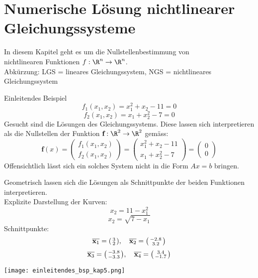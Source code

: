 \section{Numerische Lösung nichtlinearer Gleichungssysteme}

\begin{remark}
    In diesem Kapitel geht es um die Nullstellenbestimmung von\\ nichtlinearen Funktionen $f: \R^n \to \R^n$. \\
    Abkürzung: LGS = lineares Gleichungssystem, NGS = nichtlineares Gleichungssystem
\end{remark}

\begin{example2}{Einleitendes Beispiel}
    $$f_1(x_1, x_2) = x_1^2 + x_2 - 11 = 0$$
    $$f_2(x_1, x_2) = x_1 + x_2^2 - 7 = 0$$
    Gesucht sind die Lösungen des Gleichungssystems. Diese lassen sich interpretieren als die Nullstellen der Funktion $\textbf{f}: \R^2 \to \R^2$ gemäss:
    $$\textbf{f}(x) = \begin{pmatrix} f_1 (x_1, x_2) \\ f_2 (x_1, x_2) \end{pmatrix} = \begin{pmatrix} x_1^2 + x_2 - 11 \\ x_1 + x_2^2 - 7 \end{pmatrix} = \begin{pmatrix} 0\\ 0 \end{pmatrix}$$
    Offensichtlich lässt sich ein solches System nicht in die Form $Ax = b$ bringen. 

    \begin{minipage}{0.5\linewidth}
    Geometrisch lassen sich die Lösungen als Schnittpunkte der beiden Funktionen interpretieren.\\
    Explizite Darstellung der Kurven:
    $$x_2 = 11 - x_1^2$$
    $$x_2 = \sqrt{7 - x_1}$$
    Schnittpunkte:
    $$\overline{\textbf{x}_1} = \begin{psmallmatrix} 3 \\ 2 \end{psmallmatrix}, \quad \overline{\textbf{x}_2} = \begin{psmallmatrix} -2.8 \\ 3.2 \end{psmallmatrix}$$
    $$\overline{\textbf{x}_3} = \begin{psmallmatrix} -3.8 \\ -3.3 \end{psmallmatrix}, \quad \overline{\textbf{x}_4} = \begin{psmallmatrix} 3.4 \\ -1.7 \end{psmallmatrix}$$
    \end{minipage}
    \begin{minipage}{0.5\linewidth}
    \texttt{[image: einleitendes\_bsp\_kap5.png]}
    \end{minipage}
\end{example2}


